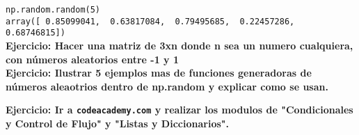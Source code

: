 \documentclass[12pt]{article}
\begin{document}
\verb+np.random.random(5)+ \\
\verb+array([ 0.85099041,  0.63817084,  0.79495685,  0.22457286,  0.68746815])+\\

{\bf Ejercicio: Hacer una matriz de 3xn donde n sea un numero cualquiera, con n\'umeros aleatorios entre 
-1 y 1}\\

{\bf Ejercicio: Ilustrar 5 ejemplos mas de funciones generadoras de n\'umeros aleaotrios dentro de np.random y explicar como se usan.}

{\bf Ejercicio: Ir a \verb+codeacademy.com+ y realizar los modulos de "Condicionales y Control de Flujo" y "Listas y Diccionarios".}




{}

\end{document}
